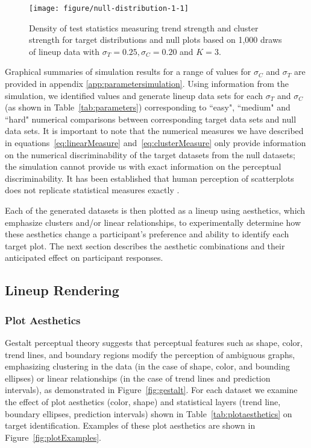 \documentclass[12pt]{article}\usepackage[]{graphicx}\usepackage[]{color}
\makeatletter
\def\maxwidth{ %
  \ifdim\Gin@nat@width>\linewidth
    \linewidth
  \else
    \Gin@nat@width
  \fi
}
\newenvironment{knitrout}{}{} %
\makeatother
\begin{document}
\begin{figure}[ht]
\centering
\begin{knitrout}
\color{fgcolor}

{\centering \texttt{[image: figure/null-distribution-1-1]} 

}



\end{knitrout}
\caption[Simulation-based test statistic density for null and target plots]{
\label{fig:targetsignal-0}
Density of test statistics measuring trend strength and cluster strength for target distributions and null plots based on 1,000 draws of lineup data with $\sigma_T= 0.25, \sigma_C=0.20$ and $K=3$.
}
\end{figure}

Graphical summaries of simulation results for a range of values for $\sigma_C$ and $\sigma_T$ are provided in appendix \ref{app:parametersimulation}. 
Using information from the simulation, we identified values and generate lineup data sets for each  $\sigma_T$ and $\sigma_C$ (as shown in Table~\ref{tab:parameters}) corresponding to ``easy", ``medium" and ``hard" numerical comparisons between corresponding target data sets and null data sets. 
It is important to note that the numerical measures we have described in equations~\eqref{eq:linearMeasure} and~\eqref{eq:clusterMeasure} only provide information on the numerical discriminability of the target datasets from the null datasets; the simulation cannot provide us with exact information on the perceptual discriminability.
It has been established that human perception of scatterplots does not replicate statistical measures exactly \citep{bobko1979perception, mosteller1981eye, lewandowsky1989perception}.

Each of the generated datasets is then plotted as a lineup using aesthetics, which emphasize clusters and/or linear relationships, to experimentally determine how these aesthetics change a participant's preference and ability to identify each target plot. 
The next section describes the aesthetic combinations and their anticipated effect on participant responses. 

\subsection{Lineup Rendering}
\subsubsection{Plot Aesthetics}
Gestalt perceptual theory suggests that perceptual features such as shape, color, trend lines, and boundary regions modify the perception of ambiguous graphs, emphasizing clustering in the data (in the case of shape, color, and bounding ellipses) or linear relationships (in the case of trend lines and prediction intervals), as demonstrated in Figure~\ref{fig:gestalt}. 
For each dataset we examine the effect of plot aesthetics (color, shape) and statistical layers (trend line, boundary ellipses, prediction intervals) shown in Table~\ref{tab:plotaesthetics}  on target identification.
Examples of these plot aesthetics are shown in Figure~\ref{fig:plotExamples}.
\end{document}
